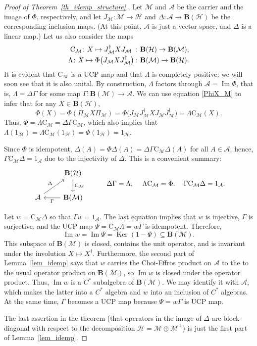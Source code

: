 \documentclass[12pt]{article}
\newcommand{\calA}{\mathcal{A}}
\newcommand{\calH}{\mathcal{H}}
\newcommand{\calM}{\mathcal{M}}
\DeclareMathOperator{\Ker}{Ker}
\DeclareMathOperator{\Img}{Im}
\newcommand{\Bo}{\mathbf{B}}
\newcommand{\Co}{\mathrm{C}}
\newtheorem[definition]{Definition}[Theorem]{Definition}
\newtheorem[remark]{Example}[Theorem]{Example}
\newtheorem[remark]{Remark}[Theorem]{Remark}
\newtheorem[remark]{Question}[Theorem]{Open question}
\newtheorem*[definition]{definition}{Definition}
\newtheorem*[remark]{example}{Example}
\newtheorem*[remark]{remark}{Remark}
\newtheorem*[remark]{question}{Open question}
\numberwithin{equation}{section}
\begin{document}
\begin{proof}[Proof of Theorem~\ref{th_idemp_structure}.]
Let $\calM$ and $\calA$ be the carrier and the image of $\Phi$, respectively, and let $J_\calM\colon\calM\to\calH$ and $\Delta\colon\calA\to\Bo(\calH)$ be the corresponding inclusion maps. (At this point, $\calA$ is just a vector space, and $\Delta$ is a linear map.) Let us also consider the maps
\[
\begin{array}{c@{\,}l}
\Co_\calM\colon X\mapsto J_\calM^\dag XJ_\calM &
\colon\Bo(\calH)\to\Bo(\calM),\vspace{2pt}\\
\Lambda\colon X\mapsto\Phi\bigl(J_\calM X J_\calM^\dag\bigr) &
\colon\Bo(\calM)\to\Bo(\calH).
\end{array}
\]
It is evident that $\Co_\calM$ is a UCP map and that $\Lambda$ is completely positive; we will soon see that it is also unital. By construction, $\Lambda$ factors through $\calA=\Img\Phi$, that is, $\Lambda=\Delta\Gamma$ for some map $\Gamma\colon\Bo(\calM)\to\calA$. We can use equation \eqref{PhiX_M} to infer that for any $X\in\Bo(\calH)$,
\[
\Phi(X)
=\Phi(\Pi_\calM X\Pi_\calM)
=\Phi\bigl(J_\calM J_\calM^\dag X J_\calM J_\calM^\dag\bigr)
=\Lambda\Co_\calM(X).
\]
Thus, $\Phi=\Lambda\Co_\calM=\Delta\Gamma\Co_\calM$, which also implies that $\Lambda(1_\calM)=\Lambda\Co_\calM(1_\calH)=\Phi(1_\calH)=1_\calH$.

Since $\Phi$ is idempotent, $\Delta(A)=\Phi\Delta(A) =\Delta\Gamma\Co_\calM\Delta(A)$ for all $A\in\calA$; hence, $\Gamma\Co_\calM\Delta=1_\calA$ due to the injectivity of $\Delta$. This is a convenient summary:
\[
\begin{tikzcd}
& \Bo(\calH) \arrow[d,"\Co_\calM"] \\
\calA \arrow[ur,"\Delta"] & \Bo(\calM) \arrow[l,"\Gamma"]
\end{tikzcd}\qquad\quad
\Delta\Gamma=\Lambda,\quad\: \Lambda\Co_\calM=\Phi.\quad\:
\Gamma\Co_\calM\Delta=1_\calA.
\]

Let $w=\Co_\calM\Delta$ so that $\Gamma w=1_\calA$. The last equation implies that $w$ is injective, $\Gamma$ is surjective, and the UCP map $\Psi=\Co_\calM\Lambda=w\Gamma$ is idempotent. Therefore,
\[
\Img w=\Img\Psi=\Ker(1-\Psi)\subseteq\Bo(\calM).
\]
This subspace of $\Bo(\calM)$ is closed, contains the unit operator, and is invariant under the involution $X\mapsto X^\dag$. Furthermore, the second part of Lemma~\ref{lem_idemp} says that $w$ carries the Choi-Effros product on $\calA$ to the to the usual operator product on $\Bo(\calM)$, so $\Img w$ is closed under the operator product. Thus, $\Img w$ is a $C^*$ subalgebra of $\Bo(\calM)$. We may identify it with $\calA$, which makes the latter into a $C^*$ algebra and $w$ into an inclusion of $C^*$ algebras. At the same time, $\Gamma$ becomes a UCP map because $\Psi=w\Gamma$ is UCP map.

The last assertion in the theorem (that operators in the image of $\Delta$ are block-diagonal with respect to the decomposition $\calH=\calM\oplus\calM^\perp$) is just the first part of Lemma~\ref{lem_idemp}.
\end{proof}
\end{document}

